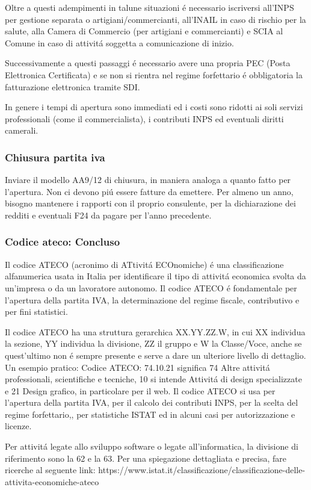\documentclass{article}
\begin{document}
Oltre a questi adempimenti in talune situazioni \'e necessario iscriversi all'INPS per gestione separata o artigiani/commercianti, all'INAIL in caso di rischio per la salute, alla Camera di Commercio (per artigiani e commercianti) e SCIA al Comune in caso di  attivit\'a soggetta a comunicazione di inizio.

Successivamente a questi passaggi \'e necessario avere una propria PEC (Posta Elettronica Certificata) e se non si rientra nel regime forfettario \'e obbligatoria la fatturazione elettronica tramite SDI. 

In genere i tempi di apertura sono immediati ed i costi sono ridotti ai soli servizi professionali (come il commercialista), i contributi INPS ed eventuali diritti camerali.

\subsubsection{Chiusura partita iva}
Inviare il modello AA9/12 di chiusura, in maniera analoga a quanto fatto per l'apertura. Non ci devono pi\'u essere fatture da emettere. Per almeno un anno, bisogno mantenere i rapporti con il proprio consulente, per la dichiarazione dei redditi e eventuali F24 da pagare per l'anno precedente.
\subsubsection{Codice ateco: Concluso}
Il codice ATECO (acronimo di ATtivit\'a ECOnomiche) \'e una classificazione alfanumerica usata in Italia per identificare il tipo di attivit\'a economica svolta da un'impresa o da un lavoratore autonomo. Il codice ATECO \'e fondamentale per l'apertura della partita IVA, la determinazione del regime fiscale, contributivo e per fini statistici. 

Il codice ATECO ha una struttura gerarchica XX.YY.ZZ.W, in cui XX individua la sezione, YY individua la divisione, ZZ il gruppo e W la Classe/Voce, anche se quest'ultimo non \'e sempre presente e serve a dare un ulteriore livello di dettaglio. Un esempio pratico: Codice ATECO: 74.10.21 significa 74 Altre attivit\'a professionali, scientifiche e tecniche, 10 si intende Attivit\'a di design specializzate e 21 Design grafico, in particolare per il web. Il codice ATECO si usa per l'apertura della partita IVA, per il calcolo dei contributi INPS, per la scelta del regime forfettario,, per statistiche ISTAT ed in alcuni casi per autorizzazione e licenze.

Per attivit\'a legate allo sviluppo software o legate all'informatica, la divisione di riferimento sono la 62 e la 63. 
Per una spiegazione dettagliata e precisa, fare ricerche al seguente link: https://www.istat.it/classificazione/classificazione-delle-attivita-economiche-ateco
\end{document}
